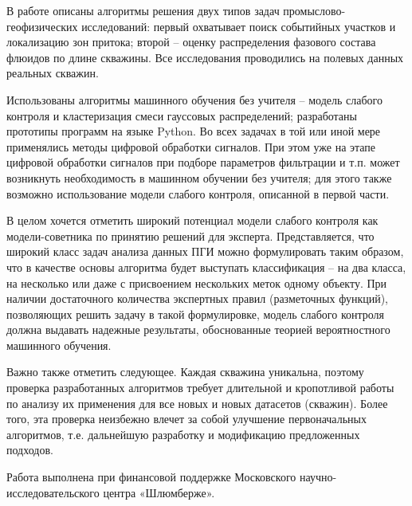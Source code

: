 \par
В работе описаны алгоритмы решения двух типов задач промыслово-геофизических исследований: первый охватывает поиск событийных участков и локализацию зон притока; второй –  оценку распределения фазового состава флюидов по длине скважины. Все исследования проводились на полевых данных реальных скважин.
\par
Использованы алгоритмы машинного обучения без учителя – модель слабого контроля и кластеризация смеси гауссовых распределений; разработаны прототипы программ на языке Python. Во всех задачах в той или иной мере применялись методы цифровой обработки сигналов. При этом уже на этапе цифровой обработки сигналов при подборе параметров фильтрации и т.п. может возникнуть необходимость в машинном обучении без учителя;  для этого также возможно использование модели слабого контроля, описанной в первой части.
\par
В целом хочется отметить широкий потенциал модели слабого контроля как модели-советника по принятию решений для эксперта. Представляется, что широкий класс задач анализа данных ПГИ можно формулировать таким образом, что в качестве основы алгоритма будет выступать классификация – на два класса, на несколько или даже с присвоением нескольких меток одному объекту. При наличии достаточного количества экспертных правил (разметочных функций), позволяющих решить задачу в такой формулировке, модель слабого контроля должна выдавать надежные результаты, обоснованные теорией вероятностного машинного обучения.
\par
Важно также отметить следующее. Каждая скважина уникальна, поэтому проверка разработанных алгоритмов требует длительной и кропотливой работы по анализу их применения для все новых и новых датасетов (скважин). Более того, эта проверка неизбежно влечет за собой улучшение первоначальных алгоритмов, т.е. дальнейшую разработку и модификацию предложенных подходов.
\newline
\par
Работа выполнена при финансовой поддержке Московского научно-исследовательского центра «Шлюмберже».
